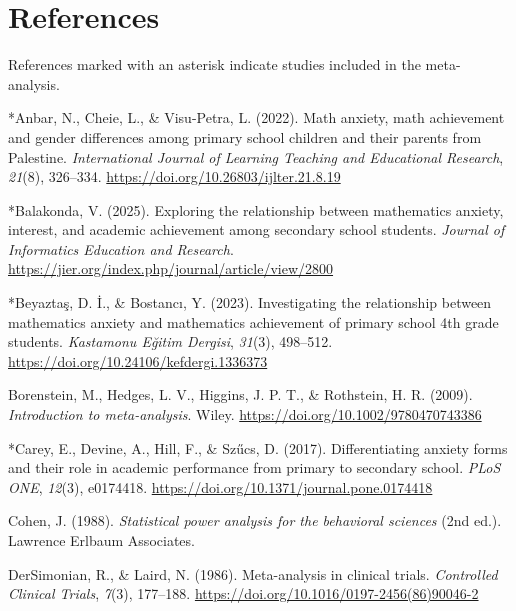 \documentclass[man,a4paper,12pt,floatsintext,nolmodern,notab]{apa7}
\begin{document}
\section{References}
\noindent References marked with an asterisk indicate studies included in the meta-analysis.\par
\par\noindent\hangindent=0.5in *Anbar, N., Cheie, L., \& Visu-Petra, L. (2022). Math anxiety, math achievement and gender differences among primary school children and their parents from Palestine. \textit{International Journal of Learning Teaching and Educational Research}, \textit{21}(8), 326–334. \url{https://doi.org/10.26803/ijlter.21.8.19}\par
\par\noindent\hangindent=0.5in *Balakonda, V. (2025). Exploring the relationship between mathematics anxiety, interest, and academic achievement among secondary school students. \textit{Journal of Informatics Education and Research}. \url{https://jier.org/index.php/journal/article/view/2800}\par
\par\noindent\hangindent=0.5in *Beyaztaş, D. İ., \& Bostancı, Y. (2023). Investigating the relationship between mathematics anxiety and mathematics achievement of primary school 4th grade students. \textit{Kastamonu Eğitim Dergisi}, \textit{31}(3), 498–512. \url{https://doi.org/10.24106/kefdergi.1336373}\par
\par\noindent\hangindent=0.5in Borenstein, M., Hedges, L. V., Higgins, J. P. T., \& Rothstein, H. R. (2009). \textit{Introduction to meta-analysis}. Wiley. \url{https://doi.org/10.1002/9780470743386}\par
\par\noindent\hangindent=0.5in *Carey, E., Devine, A., Hill, F., \& Szűcs, D. (2017). Differentiating anxiety forms and their role in academic performance from primary to secondary school. \textit{PLoS ONE}, \textit{12}(3), e0174418. \url{https://doi.org/10.1371/journal.pone.0174418}\par
\par\noindent\hangindent=0.5in Cohen, J. (1988). \textit{Statistical power analysis for the behavioral sciences} (2nd ed.). Lawrence Erlbaum Associates.\par
\par\noindent\hangindent=0.5in DerSimonian, R., \& Laird, N. (1986). Meta-analysis in clinical trials. \textit{Controlled Clinical Trials}, \textit{7}(3), 177–188. \url{https://doi.org/10.1016/0197-2456(86)90046-2}\par
\end{document}
